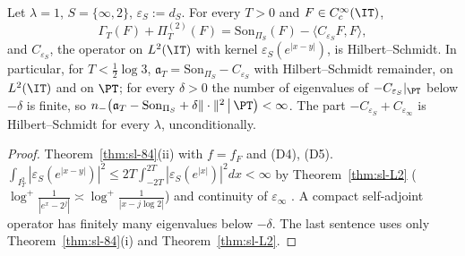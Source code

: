 \begin{corollary}\label{cor:sl-split}
Let $\lambda=1$, $S=\{\infty,2\}$, $\varepsilon_S:=d_S$. For every $T>0$ and $F\in C_c^\infty(\IT)$,
\[
\Gamma_T(F)+\Pi^{(2)}_T(F)=\mathrm{Son}_{\Pi_S}(F)-\langle C_{\varepsilon_S}F,F\rangle ,
\]
and $C_{\varepsilon_S}$, the operator on $L^2(\IT)$ with kernel $\varepsilon_S(e^{|x-y|})$, is Hilbert--Schmidt. In
particular, for $T<\frac12\log3$, $\mathfrak a_T=\mathrm{Son}_{\Pi_S}-C_{\varepsilon_S}$ with Hilbert--Schmidt remainder, on
$L^2(\IT)$ and on $\PT$; for every $\delta>0$ the number of eigenvalues of $-C_{\varepsilon_S}|_{\PT}$ below $-\delta$ is
finite, so $n_-\big(\mathfrak a_T-\mathrm{Son}_{\Pi_S}+\delta\|\cdot\|^2\,\big|\,\PT\big)<\infty$. The part
$-C_{\varepsilon_S}+C_{\varepsilon_\infty}$ is Hilbert--Schmidt for every $\lambda$, unconditionally.
\end{corollary}
\begin{proof}
Theorem~\ref{thm:sl-84}(ii) with $f=f_F$ and (D4), (D5). $\int_{I_T^2}|\varepsilon_S(e^{|x-y|})|^2\le2T\int_{-2T}^{2T}|\varepsilon_S(e^{|x|})|^2dx<\infty$
by Theorem~\ref{thm:sl-L2} ($\log^+\frac1{|e^x-2^j|}\asymp\log^+\frac1{|x-j\log2|}$) and continuity of $\varepsilon_\infty$
\cite[(84)]{ConnesConsani2021}. A compact self-adjoint operator has finitely many eigenvalues below $-\delta$.
The last sentence uses only Theorem~\ref{thm:sl-84}(i) and Theorem~\ref{thm:sl-L2}.
\end{proof}

